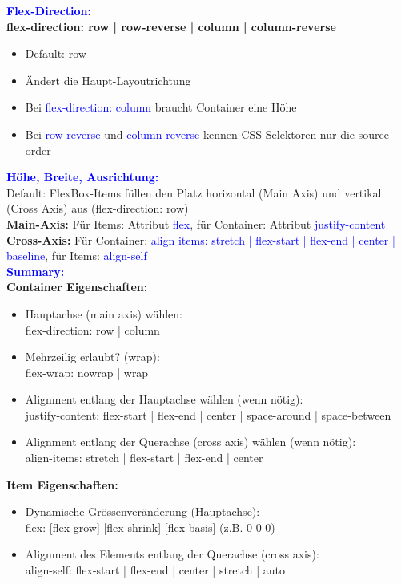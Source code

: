 \textbf{\textcolor{blue}{Flex-Direction:}}\\
\textbf{flex-direction: row | row-reverse | column | column-reverse}
\begin{itemize}[topsep=0pt, leftmargin=3mm]
    \setlength\itemsep{-0.3em}
    \item Default: row
    \item Ändert die Haupt-Layoutrichtung
    \item Bei \textcolor{blue}{flex-direction: column} braucht Container eine Höhe
    \item Bei \textcolor{blue}{row-reverse} und \textcolor{blue}{column-reverse} kennen CSS Selektoren nur die source order
\end{itemize}
\textbf{\textcolor{blue}{Höhe, Breite, Ausrichtung:}}\\
Default: FlexBox-Items füllen den Platz horizontal (Main Axis) und vertikal (Cross Axis) aus (flex-direction: row)\\
\textbf{Main-Axis:} Für Items: Attribut \textcolor{blue}{flex}, für Container: Attribut \textcolor{blue}{justify-content}\\
\textbf{Cross-Axis:} Für Container: \textcolor{blue}{align items: stretch | flex-start | flex-end | center | baseline}, für Items: \textcolor{blue}{align-self}\\
\textbf{\textcolor{blue}{Summary:}}\\
\textbf{Container Eigenschaften:}
\begin{itemize}[topsep=0pt, leftmargin=3mm]
    \setlength\itemsep{-0.3em}
    \item Hauptachse (main axis) wählen:\\
    flex-direction: row | column
    \item Mehrzeilig erlaubt? (wrap):\\
    flex-wrap: nowrap | wrap
    \item Alignment entlang der Hauptachse wählen (wenn nötig):\\
    justify-content: flex-start | flex-end | center | space-around | space-between
    \item Alignment entlang der Querachse (cross axis) wählen (wenn nötig):\\
    align-items: stretch | flex-start | flex-end | center
\end{itemize}
\textbf{Item Eigenschaften:}
\begin{itemize}[topsep=0pt, leftmargin=3mm]
    \setlength\itemsep{-0.3em}
    \item Dynamische Grössenveränderung (Hauptachse):\\
    flex: [flex-grow] [flex-shrink] [flex-basis] (z.B. 0 0 0)
    \item Alignment des Elements entlang der Querachse (cross axis):\\
    align-self: flex-start | flex-end | center | stretch | auto
\end{itemize}

